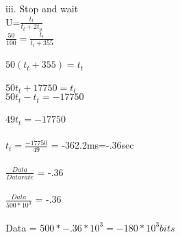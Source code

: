 \documentclass[a4paper,12pt]{article}
\begin{document}
iii. Stop and wait\\
U=$\frac{t_{t}}{t_{t}+2t_{p}}$\\
$\frac{50}{100} = \frac{t_{t}}{t_{t}+355}$\\\\
$50(t_{t}+355)=t_{t}$\\\\
$50t_{t} + 17750 = t_{t}$\\
$50t_{t}-t_{t} = -17750$\\\\
$49t_{t}=-17750$\\\\
$t_{t} = \frac{-17750}{49}$ = -362.2ms=-.36sec\\\\
$\frac{Data}{Datarate}$ = -.36\\\\
$\frac{Data}{500*10^3}$ = -.36\\\\
Data = $500* -.36*10^3= -180 * 10^3 bits$\\\\
\end{document}
